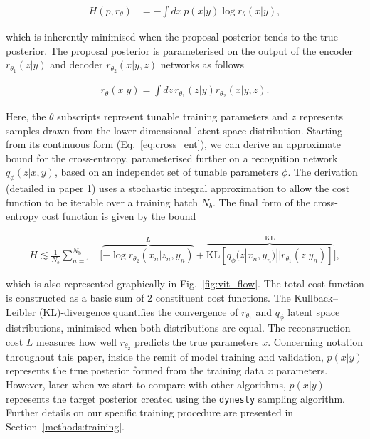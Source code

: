 \documentclass[a4paper]{jpconf}
\begin{document}
\begin{align}\label{eq:cross_ent} 
H(p,r_\theta) &= -\int dx\, p(x|y) \log r_{\theta}(x|y),
\end{align}

which is inherently minimised when the proposal posterior tends to the true posterior. The proposal posterior is parameterised on the output of the encoder $r_{\theta_1}(z|y)$ and decoder $r_{\theta_2}(x|y,z)$ networks as follows

\begin{align}\label{eq:prop_post}
r_{\theta}(x|y) = \int dz\,r_{\theta_1}(z|y)r_{\theta_2}(x|y,z).
\end{align}

Here, the $\theta$ subscripts represent tunable training parameters and $z$ represents samples drawn from the lower dimensional latent space distribution. Starting from its continuous form (Eq.~\ref{eq:cross_ent}), we can derive an approximate bound for the cross-entropy, parameterised further on a recognition network $q_{\phi}(z|x,y)$, based on an independet set of tunable parameters $\phi$. The derivation (detailed in paper 1) uses a stochastic integral approximation to allow the cost function to be iterable over a training batch $N_b$. The final form of the cross-entropy cost function is given by the bound

\begin{align}\label{eq:cost_approx} H \lesssim
\frac{1}{N_b}\sum_{n=1}^{N_{\text{b}}}&\Big[\overbrace{-\log
	r_{\theta_{2}}(x_{n}|z_{n},y_{n})}^{L}+\overbrace{\text{KL}\left[q_{\phi}(z|x_{n},y_{n})||r_{\theta_{1}}(z|y_{n})\right]}^{\text{KL}}\Big],
\end{align}

which is also represented graphically in Fig.~\ref{fig:vit_flow}. The total cost function is constructed as a basic sum of 2 constituent cost functions. The Kullback–Leibler (KL)-divergence quantifies the convergence of $r_{\theta_1}$ and $q_{\phi}$ latent space distributions, minimised when both distributions are equal. The reconstruction cost $L$ measures how well $r_{\theta_2}$ predicts the true parameters $x$. Concerning notation throughout this paper, inside the remit of model training and validation, $p(x|y)$ represents the true posterior formed from the training data $x$ parameters. However, later when we start to compare with other algorithms, $p(x|y)$ represents the target posterior created using the \texttt{dynesty} sampling algorithm. Further details on our specific training procedure are presented in Section~\ref{methods:training}. 
\end{document}

